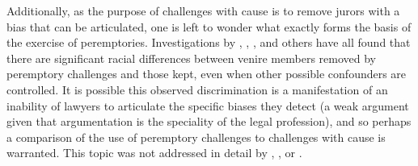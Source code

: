 Additionally, as the purpose of challenges with cause is to remove jurors with a bias that can be articulated, one is left to
wonder what exactly forms the basis of the exercise of peremptories. Investigations by
\cite{PerempChalMurder}, \cite{JurySunshineProj}, \cite{StubbornLegacy}, and others have all found that there are significant
racial differences between venire members removed by peremptory challenges and those kept, even when other possible confounders
are controlled. It is possible this observed discrimination is a manifestation of an inability of lawyers to
articulate the specific biases they detect (a weak argument given that argumentation is the speciality of the legal
  profession), and so perhaps a comparison of the use of peremptory challenges to challenges with cause is warranted. This topic was not addressed in
detail by \cite{PerempChalMurder}, \cite{JurySunshineProj}, or \cite{StubbornLegacy}.